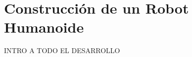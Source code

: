 \chapter{Construcci\'on de un Robot Humanoide}\label{chapter:introAdesarrollo}

INTRO A TODO EL DESARROLLO



